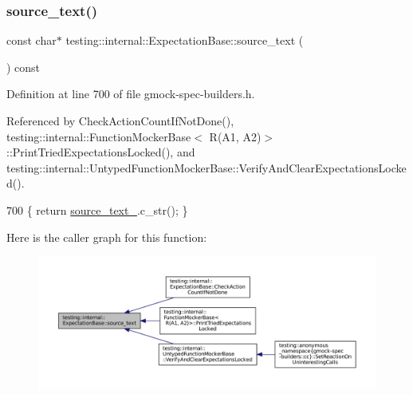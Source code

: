 \subsubsection{\texorpdfstring{source\+\_\+text()}{source\_text()}}
{\footnotesize\ttfamily const char$\ast$ testing\+::internal\+::\+Expectation\+Base\+::source\+\_\+text (\begin{DoxyParamCaption}{ }\end{DoxyParamCaption}) const\hspace{0.3cm}{\ttfamily [inline]}}



Definition at line 700 of file gmock-\/spec-\/builders.\+h.



Referenced by Check\+Action\+Count\+If\+Not\+Done(), testing\+::internal\+::\+Function\+Mocker\+Base$<$ R(\+A1, A2)$>$\+::\+Print\+Tried\+Expectations\+Locked(), and testing\+::internal\+::\+Untyped\+Function\+Mocker\+Base\+::\+Verify\+And\+Clear\+Expectations\+Locked().


\begin{DoxyCode}
700 \{ \textcolor{keywordflow}{return} \hyperlink{classtesting_1_1internal_1_1ExpectationBase_a8803b5fa8354205a6b57e21a704acbef}{source\_text\_}.c\_str(); \}
\end{DoxyCode}
Here is the caller graph for this function\+:
\nopagebreak
\begin{figure}[H]
\begin{center}
\leavevmode
\includegraphics[width=350pt]{classtesting_1_1internal_1_1ExpectationBase_a77efdf254df61cfc4f28c91b0e6f62aa_icgraph}
\end{center}
\end{figure}
\mbox{\label{classtesting_1_1internal_1_1ExpectationBase_a3d1d08542b32239d9b5738e3e32e2217}} 
